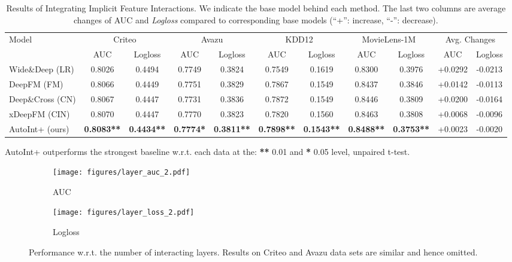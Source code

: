\begin{table*}
\begin{threeparttable}
\centering\caption{Results of Integrating Implicit Feature Interactions. We indicate the base model behind each method. The last two columns are average changes of AUC and \textit{Logloss} compared to corresponding base models (``+'': increase, ``-'': decrease).}\label{tab::ensemble}
\begin{tabular}{lcccccccc||cc}
\toprule
\multirow{2}{*}{Model} & \multicolumn{2}{c}{Criteo} & \multicolumn{2}{c}{Avazu} & \multicolumn{2}{c}{KDD12} & \multicolumn{2}{c}{MovieLens-1M} & \multicolumn{2}{c}{Avg. Changes}\\
& AUC & Logloss & AUC & Logloss & AUC & Logloss & AUC & Logloss & AUC & Logloss\\
\midrule
Wide\&Deep (LR) & 0.8026 & 0.4494 & 0.7749 & 0.3824 & 0.7549 & 0.1619 & 0.8300 & 0.3976 & +0.0292 & -0.0213 \\
DeepFM (FM) & 0.8066 & 0.4449 & 0.7751 & 0.3829 & 0.7867 & 0.1549 & 0.8437 & 0.3846 & +0.0142 & -0.0113\\
Deep\&Cross (CN) & 0.8067 & 0.4447 & 0.7731 & 0.3836 & 0.7872 & 0.1549 & 0.8446 & 0.3809 & +0.0200 & -0.0164 \\
xDeepFM (CIN) & 0.8070 & 0.4447 & 0.7770 & 0.3823 & 0.7820 & 0.1560 & 0.8463 & 0.3808 & +0.0068 & -0.0096 \\
AutoInt+ (ours) & \textbf{0.8083**} & \textbf{0.4434**} & \textbf{0.7774*} & \textbf{0.3811**} & \textbf{0.7898**} & \textbf{0.1543**} & \textbf{0.8488**} & \textbf{0.3753**} & +0.0023 & -0.0020 \\ 
\bottomrule
\end{tabular}
    \begin{tablenotes}
    \centering
      \small
      \item AutoInt+ outperforms the strongest baseline w.r.t. each data at the: \textbf{**} 0.01 and \textbf{*} 0.05 level, unpaired t-test.
    \end{tablenotes}
\end{threeparttable}
\vspace{-5pt}
\end{table*}


\begin{figure}
\centering
\begin{subfigure}[b]{0.49\linewidth}
    \texttt{[image: figures/layer\_auc\_2.pdf]}
    \caption{AUC}
  \end{subfigure}
  \begin{subfigure}[b]{0.49\linewidth}
    \texttt{[image: figures/layer\_loss\_2.pdf]}
    \caption{Logloss}
  \end{subfigure}
  \caption{Performance w.r.t. the number of interacting layers. Results on Criteo and Avazu data sets are similar and hence omitted.}
  \vspace{-10pt}
  \label{fig::layer}
\end{figure}

